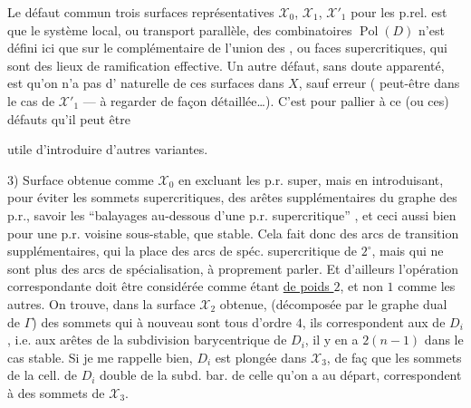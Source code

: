 Le défaut commun  trois surfaces représentatives $\mathcal X_0$, $\mathcal X_1$, $\mathcal X'_1$ pour les p.rel. est que le système local, ou transport parallèle, des   combinatoires $\operatorname{Pol}(D)$ n'est défini ici que sur le complémentaire de l'union des , ou faces supercritiques, qui sont des lieux de ramification effective.
Un autre défaut, sans doute apparenté, est qu'on n'a pas d' naturelle de ces surfaces dans $X$, sauf erreur ( peut-être dans le cas de $\mathcal X'_1$ --- à regarder de façon  détaillée\ldots). C'est pour pallier à ce (ou ces) défauts qu'il peut être

utile d'introduire d'autres variantes.

3)  Surface obtenue comme $\mathcal X_0$ en excluant les p.r. super, mais en introduisant, pour éviter les sommets supercritiques, des arêtes supplémentaires du graphe \inserted{$\Gamma$} des p.r., savoir les ``balayages au-dessous d'une p.r. supercritique'' , et ceci aussi bien pour une p.r. voisine sous-stable, que stable. Cela fait donc des arcs de transition supplémentaires, qui  la place des arcs de spéc. supercritique de $2^\circ$, mais qui ne sont plus des arcs de spécialisation, à proprement parler. Et d'ailleurs l'opération correspondante doit être considérée comme étant \uline{de poids $2$}, et non $1$ comme les autres.
On trouve, dans la surface $\mathcal X_2$ obtenue,  (décomposée  par le graphe dual de $\Gamma$) des sommets qui à nouveau sont tous d'ordre $4$, ils  correspondent aux   de $D_i$ , i.e. aux arêtes de la subdivision barycentrique  de $D_i$, il y en a $2(n-1)$ dans le cas stable.
Si je me rappelle bien, $D_i$ est plongée dans $\mathcal X_3$, de faç que les sommets de la  cell. de $D_i$ double de la subd. bar. de celle qu'on a au départ,  correspondent à des sommets de $\mathcal X_3$.

